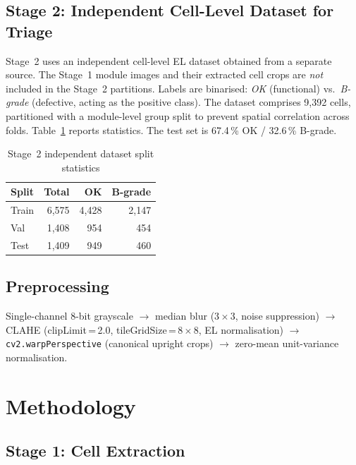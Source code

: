 \documentclass[conference]{IEEEtran}
\begin{document}
\subsection{Stage 2: Independent Cell-Level Dataset for Triage}
Stage~2 uses an independent cell-level EL dataset obtained from a separate source. The Stage~1 module images and their extracted cell crops are \textit{not} included in the Stage~2 partitions. Labels are binarised: \textit{OK} (functional) vs.\ \textit{B-grade} (defective, acting as the positive class). The dataset comprises 9{,}392 cells, partitioned with a module-level group split to prevent spatial correlation across folds. Table~\ref{tab:datasplit} reports statistics. The test set is 67.4\,\% OK / 32.6\,\% B-grade.

\begin{table}[t]
  \caption{Stage~2 independent dataset split statistics}
  \label{tab:datasplit}
  \begin{center}
  \renewcommand{\arraystretch}{1.05}\small
  \begin{tabular}{lrrr}
    \toprule
    \textbf{Split} & \textbf{Total} & \textbf{OK} & \textbf{B-grade}\\
    \midrule
    Train & 6{,}575 & 4{,}428 & 2{,}147\\
    Val   & 1{,}408 &   954   &   454\\
    Test  & 1{,}409 &   949   &   460\\
    \bottomrule
  \end{tabular}
  \end{center}
\end{table}

\subsection{Preprocessing}
Single-channel 8-bit grayscale $\to$ median blur ($3\times3$, noise suppression) $\to$ CLAHE (clipLimit\,=\,2.0, tileGridSize\,=\,$8\times8$, EL normalisation) $\to$ \texttt{cv2.warpPerspective} (canonical upright crops) $\to$ zero-mean unit-variance normalisation.

\section{Methodology}
\label{sec:method}

\subsection{Stage 1: Cell Extraction}
\label{sec:stage1}
\end{document}

